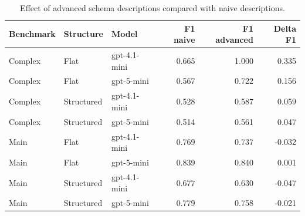 \begin{table}[htbp]
\centering
\small
\caption{Effect of advanced schema descriptions compared with naive descriptions.}
\label{tab:schema-description-effect}
\begin{tabular}{lllrrr}
\toprule
Benchmark & Structure & Model & F1 naive & F1 advanced & Delta F1 \\
\midrule
Complex & Flat & gpt-4.1-mini & 0.665 & 1.000 & 0.335 \\
Complex & Flat & gpt-5-mini & 0.567 & 0.722 & 0.156 \\
Complex & Structured & gpt-4.1-mini & 0.528 & 0.587 & 0.059 \\
Complex & Structured & gpt-5-mini & 0.514 & 0.561 & 0.047 \\
Main & Flat & gpt-4.1-mini & 0.769 & 0.737 & -0.032 \\
Main & Flat & gpt-5-mini & 0.839 & 0.840 & 0.001 \\
Main & Structured & gpt-4.1-mini & 0.677 & 0.630 & -0.047 \\
Main & Structured & gpt-5-mini & 0.779 & 0.758 & -0.021 \\
\bottomrule
\end{tabular}
\end{table}
